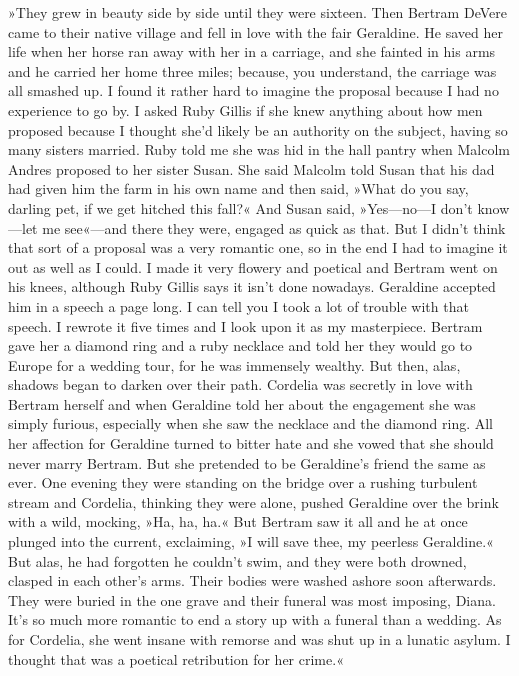 »They grew in beauty side by side until they were sixteen. Then Bertram DeVere came to their native village and fell in love with the fair Geraldine. He saved her life when her horse ran away with her in a carriage, and she fainted in his arms and he carried her home three miles; because, you understand, the carriage was all smashed up. I found it rather hard to imagine the proposal because I had no experience to go by. I asked Ruby Gillis if she knew anything about how men proposed because I thought she’d likely be an authority on the subject, having so many sisters married. Ruby told me she was hid in the hall pantry when Malcolm Andres proposed to her sister Susan. She said Malcolm told Susan that his dad had given him the farm in his own name and then said, »What do you say, darling pet, if we get hitched this fall?« And Susan said, »Yes—no—I don’t know—let me see«—and there they were, engaged as quick as that. But I didn’t think that sort of a proposal was a very romantic one, so in the end I had to imagine it out as well as I could. I made it very flowery and poetical and Bertram went on his knees, although Ruby Gillis says it isn’t done nowadays. Geraldine accepted him in a speech a page long. I can tell you I took a lot of trouble with that speech. I rewrote it five times and I look upon it as my masterpiece. Bertram gave her a diamond ring and a ruby necklace and told her they would go to Europe for a wedding tour, for he was immensely wealthy. But then, alas, shadows began to darken over their path. Cordelia was secretly in love with Bertram herself and when Geraldine told her about the engagement she was simply furious, especially when she saw the necklace and the diamond ring. All her affection for Geraldine turned to bitter hate and she vowed that she should never marry Bertram. But she pretended to be Geraldine’s friend the same as ever. One evening they were standing on the bridge over a rushing turbulent stream and Cordelia, thinking they were alone, pushed Geraldine over the brink with a wild, mocking, »Ha, ha, ha.« But Bertram saw it all and he at once plunged into the current, exclaiming, »I will save thee, my peerless Geraldine.« But alas, he had forgotten he couldn’t swim, and they were both drowned, clasped in each other’s arms. Their bodies were washed ashore soon afterwards. They were buried in the one grave and their funeral was most imposing, Diana. It’s so much more romantic to end a story up with a funeral than a wedding. As for Cordelia, she went insane with remorse and was shut up in a lunatic asylum. I thought that was a poetical retribution for her crime.«

